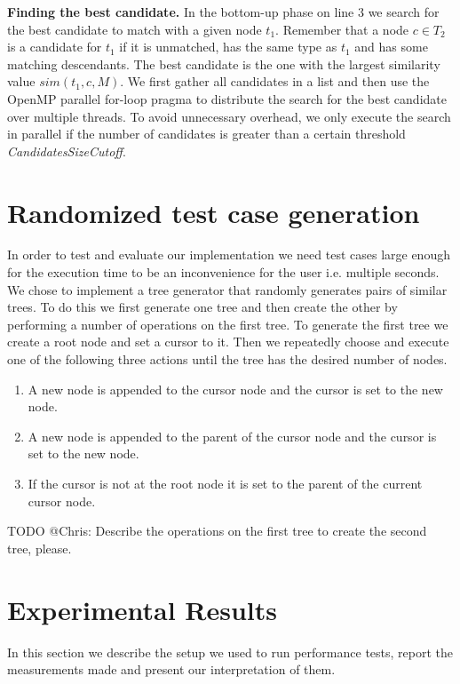 \documentclass[letterpaper]{article}
\newcommand{\mypar}[1]{{\bf #1.}}
\begin{document}
\mypar{Finding the best candidate}
In the bottom-up phase on line 3 we search for the best candidate to match with a given node $t_1$.
Remember that a node $c \in T_2$ is a candidate for $t_1$ if it is unmatched, has the same type as $t_1$ and has some matching descendants.
The best candidate is the one with the largest similarity value $sim(t_1,c,M)$.
We first gather all candidates in a list and then use the OpenMP parallel for-loop pragma to distribute the search for the best candidate over multiple threads.
To avoid unnecessary overhead, we only execute the search in parallel if the number of candidates is greater than a certain threshold \emph{CandidatesSizeCutoff}.

\section{Randomized test case generation}

In order to test and evaluate our implementation we need test cases large enough for the execution time to be an inconvenience for the user i.e. multiple seconds.
We chose to implement a tree generator that randomly generates pairs of similar trees.
To do this we first generate one tree and then create the other by performing a number of operations on the first tree.
To generate the first tree we create a root node and set a cursor to it.
Then we repeatedly choose and execute one of the following three actions until the tree has the desired number of nodes.
\begin{enumerate}
	\item A new node is appended to the cursor node and the cursor is set to the new node.
	\item A new node is appended to the parent of the cursor node and the cursor is set to the new node.
	\item If the cursor is not at the root node it is set to the parent of the current cursor node.
\end{enumerate}
TODO @Chris: Describe the operations on the first tree to create the second tree, please.

\section{Experimental Results}\label{sec:exp}

In this section we describe the setup we used to run performance tests, report the measurements made and present our interpretation of them.
\end{document}
